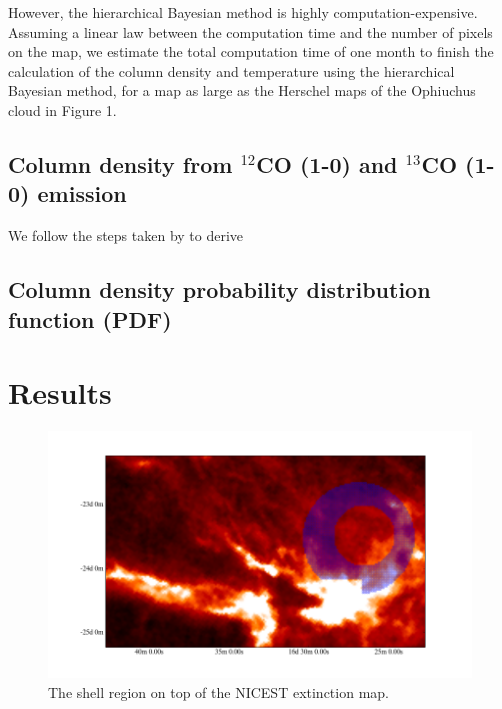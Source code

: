 \documentclass[11pt,a4paper]{emulateapj}
\begin{document}
However, the hierarchical Bayesian method is highly computation-expensive. Assuming a linear law between the computation time and the number of pixels on the map, we estimate the total computation time of one month to finish the calculation of the column density and temperature using the hierarchical Bayesian method, for a map as large as the Herschel maps of the Ophiuchus cloud in Figure 1.

\subsection{Column density from $^{12}$CO (1-0) and $^{13}$CO (1-0) emission}
We follow the steps taken by \citet{Pineda_2008} to derive

\subsection{Column density probability distribution function (PDF)}


\section{Results}
\label{sec:results}

\begin{figure}[ht]
\centering
\includegraphics[scale=0.35]{fig/shell_2mass.png}
\caption{The shell region on top of the NICEST extinction map.
}
\end{figure}
\end{document}
